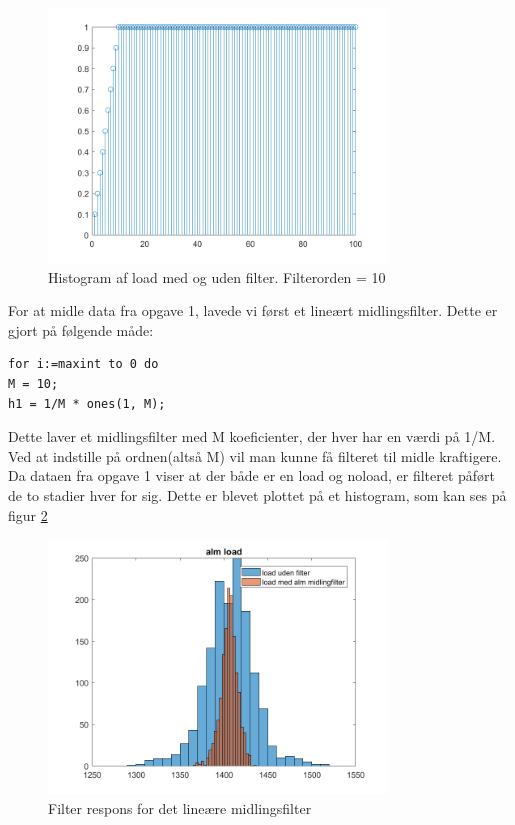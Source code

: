 \documentclass[12pt]{article}
\begin{document}
\begin{figure}[H]
	\centering
	\includegraphics[width=90mm]{Img/respons_alm.png}
	\caption{Histogram af load med og uden filter. Filterorden = 10}
	\label{fig:stem_fir}
\end{figure}

For at midle data fra opgave 1, lavede vi først et lineært midlingsfilter. Dette er gjort på følgende måde:

\begin{lstlisting}[frame=single]  % Start your code-block
for i:=maxint to 0 do
M = 10;
h1 = 1/M * ones(1, M);
\end{lstlisting}
Dette laver et midlingsfilter med M koeficienter, der hver har en værdi på 1/M. Ved at indstille på ordnen(altså M) vil man kunne få filteret til midle kraftigere. \\

Da dataen fra opgave 1 viser at der både er en load og noload, er filteret påført de to stadier hver for sig. Dette er blevet plottet på et histogram, som kan ses på figur \ref{fig:histogram1}

\begin{figure}[H]
	\centering
	\includegraphics[width=90mm]{Img/Histogram_load_L.png}
	\caption{Filter respons for det lineære midlingsfilter}
	\label{fig:histogram1}
\end{figure}
\end{document}
